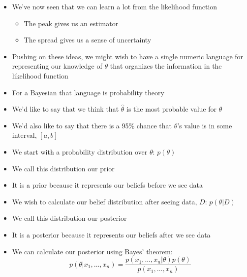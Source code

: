 \documentclass{beamer}
\begin{document}
\frame
{
  \begin{itemize}
    \item{We've now seen that we can learn a lot from the likelihood function}
    \begin{itemize}
      \item{The peak gives us an estimator}
      \item{The spread gives us a sense of uncertainty}
    \end{itemize}
  \end{itemize}
}

\frame
{
  \begin{itemize}
    \item{Pushing on these ideas, we might wish to have a single numeric language for representing our knowledge of $\theta$ that organizes the information in the likelihood function}
    \item{For a Bayesian that language is probability theory}
    \item{We'd like to say that we think that $\hat{\theta}$ is the most probable value for $\theta$}
    \item{We'd also like to say that there is a 95\% chance that $\theta$'s value is in some interval, $[a, b]$}
  \end{itemize}
}

\frame
{
  \begin{itemize}
    \item{We start with a probability distribution over $\theta$: $p(\theta)$}
    \item{We call this distribution our prior}
    \item{It is a prior because it represents our beliefs before we see data}
  \end{itemize}
}

\frame
{
  \begin{itemize}
    \item{We wish to calculate our belief distribution after seeing data, $D$:
$p(\theta | D)$}
    \item{We call this distribution our posterior}
    \item{It is a posterior because it represents our beliefs after we see data}
  \end{itemize}
}

\frame
{
  \begin{itemize}
    \item{We can calculate our posterior using Bayes' theorem:}
\[
p(\theta | x_1, \ldots, x_n) = \frac{p(x_1, \ldots, x_n | \theta) p(\theta)}{p(x_1, \ldots, x_n)}
\]
  \end{itemize}
}
\end{document}

